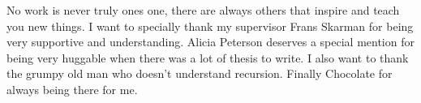 No work is never truly ones one, there are always others that inspire and teach you new things. I want to specially thank my supervisor Frans Skarman for being very supportive and understanding. Alicia Peterson deserves a special mention for being very huggable when there was a lot of thesis to write. I also want to thank the grumpy old man who doesn't understand recursion. Finally Chocolate for always being there for me.
